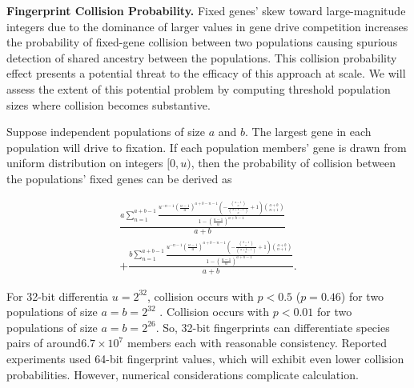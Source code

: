 \textbf{Fingerprint Collision Probability.}
Fixed genes' skew toward large-magnitude integers due to the dominance of larger values in gene drive competition increases the probability of fixed-gene collision between two populations causing spurious detection of shared ancestry between the populations.
This collision probability effect presents a potential threat to the efficacy of this approach at scale.
We will assess the extent of this potential problem by computing threshold population sizes where collision becomes substantive.

Suppose independent populations of size $a$ and $b$.
The largest gene in each population will drive to fixation.
If each population members' gene is drawn from uniform distribution on integers $[0, u)$, then the probability of collision between the populations' fixed genes can be derived as

\begin{align*}
\frac{a \sum_{n=1}^{a + b - 1} \frac{u^{- n - 1} \left(\frac{u - 1}{u}\right)^{a + b - n - 1} \left(- \frac{{\binom{a - 1}{n}}}{{\binom{a + b - 1}{n}}} + 1\right) {\binom{a + b}{n + 1}}}{1 - \left(\frac{u - 1}{u}\right)^{a + b - 1}}}{a + b} \\
+ \frac{b \sum_{n=1}^{a + b - 1} \frac{u^{- n - 1} \left(\frac{u - 1}{u}\right)^{a + b - n - 1} \left(- \frac{{\binom{b - 1}{n}}}{{\binom{a + b - 1}{n}}} + 1\right) {\binom{a + b}{n + 1}}}{1 - \left(\frac{u - 1}{u}\right)^{a + b - 1}}}{a + b}.
\end{align*}


For 32-bit differentia $u = 2^{32}$, collision occurs with $p < 0.5$ ($p = 0.46$) for two populations of size $a = b = 2^{32}$ .
Collision occurs with $p < 0.01$ for two populations of size $a = b = 2^{26}$.
So, 32-bit fingerprints can differentiate species pairs of around$ 6.7 \times 10^{7}$ members each with reasonable consistency.
Reported experiments used 64-bit fingerprint values, which will exhibit even lower collision probabilities.
However, numerical considerations complicate calculation.
